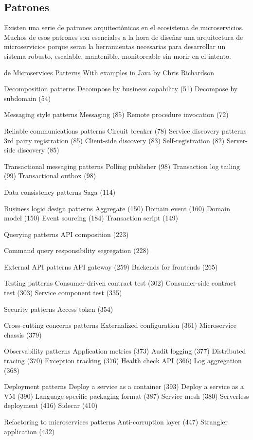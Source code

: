 \subsection{Patrones}

Existen una serie de patrones arquitectónicos en el ecosistema de microservicios.
Muchos de esos patrones son esenciales a la hora de diseñar una arquitectura de microservicios porque seran la herramientas
necesarias para desarrollar un sistema robusto, escalable, mantenible, monitoreable sin morir en el intento.

de
Microservices Patterns With examples in Java by Chris Richardson

Decomposition patterns
Decompose by business capability (51)
Decompose by subdomain (54)

Messaging style patterns
Messaging (85)
Remote procedure invocation (72)

Reliable communications patterns
Circuit breaker (78)
Service discovery patterns
3rd party registration (85)
Client-side discovery (83)
Self-registration (82)
Server-side discovery (85)

Transactional messaging patterns
Polling publisher (98)
Transaction log tailing (99)
Transactional outbox (98)

Data consistency patterns
Saga (114)

Business logic design patterns
Aggregate (150)
Domain event (160)
Domain model (150)
Event sourcing (184)
Transaction script (149)

Querying patterns
API composition (223)

Command query responsibility segregation
(228)

External API patterns
API gateway (259)
Backends for frontends (265)

Testing patterns
Consumer-driven contract test (302)
Consumer-side contract test (303)
Service component test (335)

Security patterns
Access token (354)

Cross-cutting concerns patterns
Externalized configuration (361)
Microservice chassis (379)

Observability patterns
Application metrics (373)
Audit logging (377)
Distributed tracing (370)
Exception tracking (376)
Health check API (366)
Log aggregation (368)

Deployment patterns
Deploy a service as a container (393)
Deploy a service as a VM (390)
Language-specific packaging format (387)
Service mesh (380)
Serverless deployment (416)
Sidecar (410)

Refactoring to microservices patterns
Anti-corruption layer (447)
Strangler application (432)
